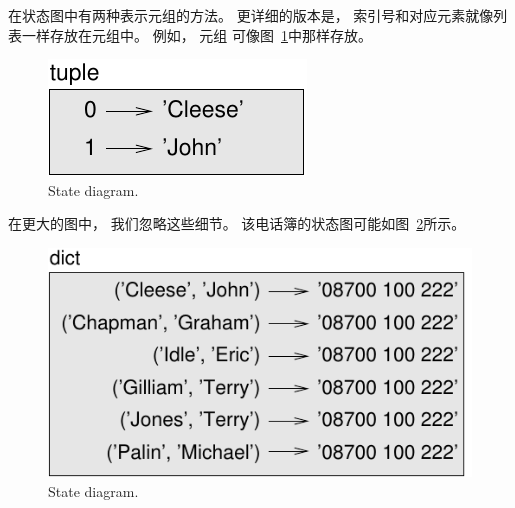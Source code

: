 {%

在状态图中有两种表示元组的方法。
更详细的版本是， 索引号和对应元素就像列表一样存放在元组中。
例如， 元组 可像图~\ref{fig.tuple1}中那样存放。
 

\begin{figure}
\centerline
{\includegraphics[scale=0.8]{../source/figs/tuple1.pdf}}
\caption{State diagram.}
\label{fig.tuple1}
\end{figure}


在更大的图中， 我们忽略这些细节。
该电话簿的状态图可能如图~\ref{fig.dict2}所示。

\begin{figure}
\centerline
{\includegraphics[scale=0.8]{../source/figs/dict2.pdf}}
\caption{State diagram.}
\label{fig.dict2}
\end{figure}


}
